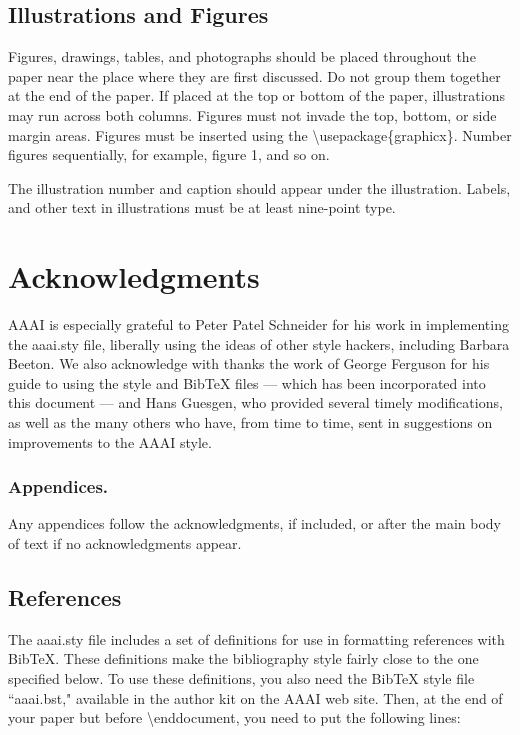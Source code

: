 \documentclass[letterpaper]{article}
\begin{document}
\subsection{Illustrations and Figures}
Figures, drawings, tables, and photographs should be placed throughout the paper near the place where they are first discussed. Do not group them together at the end of the paper. If placed at the top or bottom of the paper, illustrations may run across both columns. Figures must not invade the top, bottom, or side margin areas. Figures must be inserted using the \textbackslash usepackage\{graphicx\}. Number figures sequentially, for example, figure 1, and so on. 

The illustration number and caption should appear under the illustration. Labels, and other text in illustrations must be at least nine-point type. 

\section{ Acknowledgments}
AAAI is especially grateful to Peter Patel Schneider for his work in implementing the aaai.sty file, liberally using the ideas of other style hackers, including Barbara Beeton. We also acknowledge with thanks the work of George Ferguson for his guide to using the style and BibTeX files --- which has been incorporated into this document  --- and Hans Guesgen, who provided several timely modifications, as well as the many others who have, from time to time, sent in suggestions on improvements to the AAAI style. 

\subsubsection{Appendices.}
Any appendices follow the acknowledgments, if included, or after the main body of text if no acknowledgments appear. 

\subsection{References} 
The aaai.sty file includes a set of definitions for use in formatting references with BibTeX. These definitions make the bibliography style fairly close to the one specified below. To use these definitions, you also need the BibTeX style file ``aaai.bst," available in the author kit on the AAAI web site. Then, at the end of your paper but before \textbackslash end{document}, you need to put the following lines:
\end{document}
